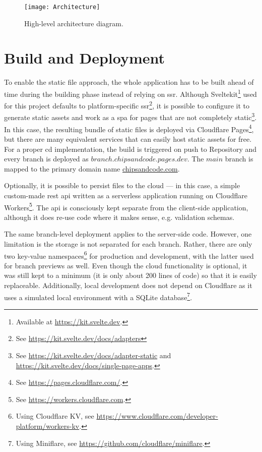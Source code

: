 \begin{figure}[H]
    \centering
    \texttt{[image: Architecture]}
    \caption{High-level architecture diagram.}
    \label{fig:design-architecture}
\end{figure}

\section{Build and Deployment}

To enable the static file approach, the whole application has to be built ahead of time during the building phase instead of relying on \gls{ssr}.
Although Sveltekit\footnote{Available at \url{https://kit.svelte.dev}.} used for this project defaults to platform-specific \gls{ssr}\footnote{See \url{https://kit.svelte.dev/docs/adapters}}, it is possible to configure it to generate static assets and work as a \gls{spa} for pages that are not completely static\footnote{See \url{https://kit.svelte.dev/docs/adapter-static} and \url{https://kit.svelte.dev/docs/single-page-apps}.}.
In this case, the resulting bundle of static files is deployed via Cloudflare Pages\footnote{See \url{https://pages.cloudflare.com/}.}, but there are many equivalent services that can easily host static assets for free.
For a proper \gls{cd} implementation, the build is triggered on push to Repository and every branch is deployed as $branch.chipsandcode.pages.dev$.
The $main$ branch is mapped to the primary domain name \href{https://chipsandcode.com/}{chipsandcode.com}.

Optionally, it is possible to persist files to the cloud --- in this case, a simple custom-made \gls{rest} \gls{api} written as a serverless application running on Cloudflare Workers\footnote{See \url{https://workers.cloudflare.com}.}.
The \gls{api} is consciously kept separate from the client-side application, although it does re-use code where it makes sense, e.g. validation schemas.

The same branch-level deployment applies to the server-side code.
However, one limitation is the storage is not separated for each branch.
Rather, there are only two key-value namespaces\footnote{Using Cloudflare KV, see \url{https://www.cloudflare.com/developer-platform/workers-kv}.} for production and development, with the latter used for branch previews as well.
Even though the cloud functionality is optional, it was still kept to a minimum (it is only about 200 lines of code) so that it is easily replaceable.
Additionally, local development does not depend on Cloudflare as it uses a simulated local environment with a SQLite database\footnote{Using Miniflare, see \url{https://github.com/cloudflare/miniflare}.}.


